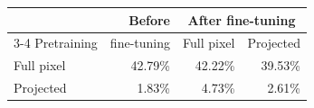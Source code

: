 \begin{tabular}{lrrr}
\toprule
 & Before & \multicolumn{2}{c}{After fine-tuning}\\
\cmidrule(lr){3-4}
Pretraining & fine-tuning & Full pixel & Projected\\
\midrule
Full pixel & 42.79\% & 42.22\% & 39.53\%\\
Projected & 1.83\% & 4.73\% & 2.61\%\\
\bottomrule
\end{tabular}
